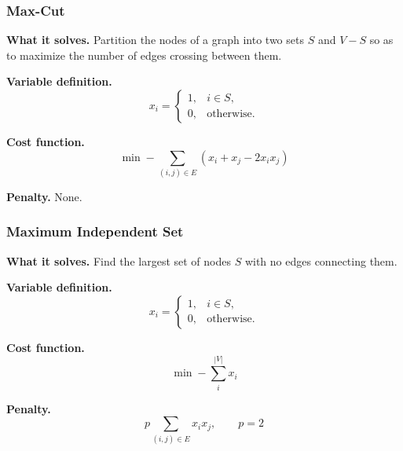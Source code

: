 \longline

\subsubsection{Max-Cut}

\textcolor{Green3}{ \textbf{What it solves.}} Partition the nodes of a graph into two sets $S$ and $V-S$ so as to maximize the number of edges crossing between them.

\highspace
\textcolor{Green3}{ \textbf{Variable definition.}}
\begin{equation*}
    x_i=
    \begin{cases}
        1, & i\in S,\\
        0, & \text{otherwise}.
    \end{cases}
\end{equation*}

\highspace
\textcolor{Red2}{ \textbf{Cost function.}}
\begin{equation}\label{eq:qubo-max-cut}
    \min
    -\sum_{(i,j)\in E}
    \left(x_i+x_j-2x_ix_j\right)
\end{equation}

\highspace
\textcolor{Red2}{ \textbf{Penalty.}} None.

\longline

\subsubsection{Maximum Independent Set}

\textcolor{Green3}{ \textbf{What it solves.}} Find the largest set of nodes $S$ with no edges connecting them.

\highspace
\textcolor{Green3}{ \textbf{Variable definition.}}
\begin{equation*}
    x_i=
    \begin{cases}
        1, & i\in S,\\
        0, & \text{otherwise}.
    \end{cases}
\end{equation*}

\highspace
\textcolor{Red2}{ \textbf{Cost function.}}
\begin{equation}\label{eq:qubo-max-independent-set}
    \min -\sum_{i}^{|V|}x_i
\end{equation}

\highspace
\textcolor{Red2}{ \textbf{Penalty.}}
\begin{equation}\label{eq:qubo-max-independent-set-penalty}
    p\sum_{(i,j)\in E}x_ix_j,
    \qquad p=2
\end{equation}

